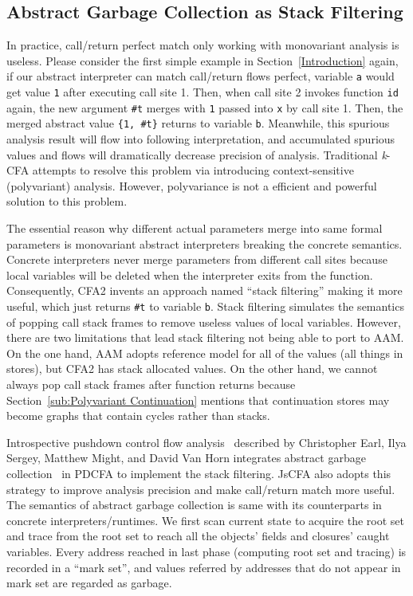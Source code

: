 \documentclass{article}
\begin{document}
\subsection{Abstract Garbage Collection as Stack Filtering}
\label{sub:filtering}
In practice, call/return perfect match only working with monovariant analysis is useless. Please consider the first simple example in Section~\ref{Introduction} again, if our abstract interpreter can match call/return flows perfect, variable \verb|a| would get value \verb|1| after executing call site 1. Then, when call site 2 invokes function \verb|id| again, the new argument \verb|#t| merges with \verb|1| passed into \verb|x| by call site 1. Then, the merged abstract value \verb|{1, #t}| returns to variable \verb|b|.
Meanwhile, this spurious analysis result will flow into following interpretation, and accumulated spurious values and flows will dramatically decrease precision of analysis.
Traditional \textit{k}-CFA attempts to resolve this problem via introducing context-sensitive (polyvariant) analysis. However, polyvariance is not a efficient and powerful solution to this problem.

The essential reason why different actual parameters merge into same formal parameters is monovariant abstract interpreters breaking the concrete semantics. Concrete interpreters never merge parameters from different call sites because local variables will be deleted when the interpreter exits from the function.
Consequently, CFA2 invents an approach named ``stack filtering'' making it more useful, which just returns \verb|#t| to variable \verb|b|. Stack filtering simulates the semantics of popping call stack frames to remove useless values of local variables. However, there are two limitations that lead stack filtering not being able to port to AAM\@. On the one hand, AAM adopts reference model for all of the values (all things in stores), but CFA2 has stack allocated values. On the other hand, we cannot always pop call stack frames after function returns because Section~\ref{sub:Polyvariant Continuation} mentions that continuation stores may become graphs that contain cycles rather than stacks.

Introspective pushdown control flow analysis~\cite{earl2012introspective} described by Christopher Earl, Ilya Sergey, Matthew Might, and David Van Horn integrates abstract garbage collection~\cite{might2006improving} in PDCFA to implement the stack filtering. JsCFA also adopts this strategy to improve analysis precision and make call/return match more useful. The semantics of abstract garbage collection is same with its counterparts in concrete interpreters/runtimes.
We first scan current state to acquire the root set and trace from the root set to reach all the objects' fields and closures' caught variables. Every address reached in last phase (computing root set and tracing) is recorded in a ``mark set'', and values referred by addresses that do not appear in mark set are regarded as garbage.
\end{document}
